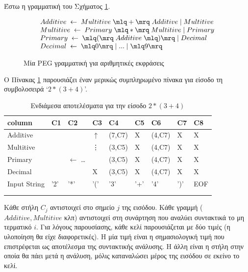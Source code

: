 Έστω η γραμματική του Σχήματος \ref{fig:peg_example_def}.

\begin{figure}
	\begin{equation}
		\begin{array}{l}
			Additive \; \leftarrow \; Multitive \; \mlq + \mrq \; Additive \; | \; Multitive \\
			Multitive \; \leftarrow \; Primary \; \mlq * \mrq \; Multitive \; | \; Primary \\
			Primary \; \leftarrow \; \mlq ( \mrq \; Additive \; \mlq ) \mrq \; | \; Decimal \\
			Decimal \; \leftarrow \; \mlq 0 \mrq \; | \; ... \; | \; \mlq 9 \mrq \; 
		\end{array}
	\end{equation}
\caption{Μία PEG γραμματική για αριθμητικές εκφράσεις}
\label{fig:peg_example_def}
\end{figure}

Ο Πίνακας \ref{tab:packrat_dp_example} παρουσιάζει έναν μερικώς συμπληρωμένο πίνακα για είσοδο τη συμβολοσειρά `${2 * (3 + 4)}$'.

\begin{longtable}{lllllllll}
    column & C1 & C2& C3& C4& C5& C6& C7& C8 \\
    \hline
    Additive&  & & $\uparrow$& (7,C7)& X& (4,C7)& X& X \\
    Multitive& &  & \vdots & (3,C5)& X& (4,C7)& X& X \\
    Primary &   & $\leftarrow$ \ldots & \circled{?}& (3,C5)& X& (4,C7)& X& X \\
    Decimal &  & & X& (3,C5)& X& (4,C7)& X& X\\
    \hline
    Input String & '2'& '*' & '('& '3'& '+'& '4'& ')'& EOF\\
	\\

	\caption{Ενδιάμεσα αποτελέσματα  για την είσοδο ${2 * (3 + 4)}$}
    \label{tab:packrat_dp_example}
\end{longtable}

Κάθε στήλη $C_j$ αντιστοιχεί στο σημείο $j$ της εισόδου.
Κάθε γραμμή ($Additive, Multitive$ κλπ) αντιστοιχεί στη συνάρτηση που αναλύει συντακτικά το μη τερματικό $i$.
Για λόγους παρουσίασης, κάθε κελί παρουσιάζεται με δύο τιμές (η υλοποίηση θα είχε διαφορετικές).
Η μία τιμή είναι η σημασιολογική τιμή που επιστρέφεται ως αποτέλεσμα της συντακτικής ανάλυσης.
Η άλλη είναι η στήλη στην οποία θα πάει μετά η ανάλυση, μόλις καταναλώσει μέρος της εισόδου σε εκείνο το κελί.

